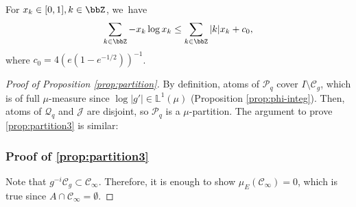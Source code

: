 \begin{lem}
\label{lem:SETE-tech}
For $x_k \in [0,1], k \in \bbZ$, we~have
\[
\sum_{k \in \bbZ} - x_k \log x_k \leq \sum_{k \in \bbZ} |k| x_k + c_0,
\]
where $c_0 = 4(e(1 - e^{-1/2}))^{-1}$.
\end{lem}

\begin{proof}[Proof of Proposition \ref{prop:partition}]
By definition, atoms of $\mathcal{P}_q$ cover $I \setminus \mathcal{C}_g$, which is of full $\mu$\nobreakdash-measure since $\log |g'| \in \mathbb{L}^1(\mu)$ (Proposition \ref{prop:phi-integ}). Then, atoms of $\mathcal{Q}_q$ and $\mathcal{J}$ are disjoint, so $\mathcal{P}_q$ is a $\mu$-partition.
The argument to prove \eqref{prop:partition3} is similar:

\subsubsection*{Proof of \eqref{prop:partition3}}
Note that $g^{-i} \mathcal{C}_g \subset \mathcal{C}_{\infty}$.
Therefore, it is enough to show $\mu_E(\mathcal{C}_{\infty}) = 0$, which is true since $A \cap \mathcal{C}_{\infty} = \emptyset$.


\end{proof}
